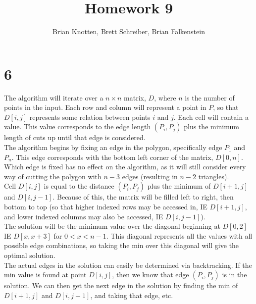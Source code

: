 \documentclass[letterpaper,notitlepage,twoside]{article}
\begin{document}
\title{Homework 9}
\author{Brian Knotten, Brett Schreiber, Brian Falkenstein}
\maketitle

\section*{6}
The algorithm will iterate over a $n\times n$ matrix, $D$, where $n$ is the number of points in the input. Each row and column will represent a point in $P$, so that $D[i, j]$ represents some relation between points $i$ and $j$. Each cell will contain a value. This value corresponds to the edge length $(P_i, P_j)$ plus the minimum length of cuts up until that edge is considered. \\
The algorithm begins by fixing an edge in the polygon, specifically edge $P_1$ and $P_n$. This edge corresponds with the bottom left corner of the matrix, $D[0, n]$. Which edge is fixed has no effect on the algorithm, as it will still consider every way of cutting the polygon with $n-3$ edges (resulting in $n-2$ triangles). \\
Cell $D[i, j]$ is equal to the distance $(P_i, P_j)$ plus the minimum of $D[i+1, j]$ and $D[i, j-1]$. Because of this, the matrix will be filled left to right, then bottom to top (so that higher indexed rows may be accessed in, IE $D[i+1, j]$, and lower indexed columns may also be accessed, IE $D[i, j-1]$). \\
The solution will be the minimum value over the diagonal beginning at $D[0,2]$ IE $D[x, x+3]$ for $0<x<n-1$. This diagonal represents all the values with all possible edge combinations, so taking the min over this diagonal will give the optimal solution. \\
The actual edges in the solution can easily be determined via backtracking. If the min value is found at point $D[i, j]$, then we know that edge $(P_i, P_j)$ is in the solution. We can then get the next edge in the solution by finding the min of $D[i+1, j]$ and $D[i, j-1]$, and taking that edge, etc. \\
\end{document}
